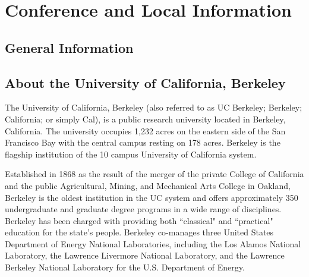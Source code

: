 \chapter{Conference and Local Information}

\setlength\fboxsep{0pt}
\setlength\fboxrule{0.5pt}



\vspace{-1.0cm}
 \section{General Information}


\section*{About the University of California, Berkeley}

The University of California, Berkeley (also referred to as UC Berkeley; Berkeley; California; or simply Cal), is a public research university located in Berkeley, California. The university occupies 1,232 acres on the eastern side of the San Francisco Bay with the central campus resting on 178 acres. Berkeley is the flagship institution of the 10 campus University of California system.

Established in 1868 as the result of the merger of the private College of California and the public Agricultural, Mining, and Mechanical Arts College in Oakland, Berkeley is the oldest institution in the UC system and offers approximately 350 undergraduate and graduate degree programs in a wide range of disciplines. Berkeley has been charged with providing both ``classical" and ``practical" education for the state's people. Berkeley co-manages three United States Department of Energy National Laboratories, including the Los Alamos National Laboratory, the Lawrence Livermore National Laboratory, and the Lawrence Berkeley National Laboratory for the U.S. Department of Energy.

